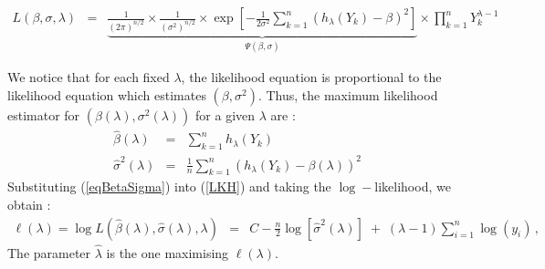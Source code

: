 \begin{eqnarray}\label{LKH}
\label{eq:MLE}
L(\beta,\sigma,\lambda)
& = &
\underbrace
{ \frac{1}{(2\pi)^{n/2}}
 \times
 \frac{1}{(\sigma^2)^{n/2}}
 \times
 \exp\left[
 -\frac{1}{2\sigma^2}
 \sum_{k=1}^{n}
 \left(
 h_\lambda(Y_k)-\beta
 \right)^2
 \right]
}_{\Psi(\beta, \sigma)}
\times 
\prod_{k=1}^{n} Y_k^{\lambda - 1}
\end{eqnarray}

We notice that for each fixed $\lambda$, the likelihood equation is proportional to the likelihood equation which estimates  $(\beta, \sigma^2)$.
Thus, the maximum likelihood estimator for $(\beta(\lambda), \sigma^2(\lambda))$ for a given $\lambda$  are :
\begin{eqnarray}\label{eqBetaSigma}
 \hat{\beta}(\lambda) & = & \sum_{k=1}^{n} h_{\lambda}(Y_k) \\
 \hat{\sigma}^2(\lambda)  & = &  \frac{1}{n} \sum_{k=1}^{n} (h_{\lambda}(Y_k) - \beta(\lambda))^2
\end{eqnarray}
Substituting (\ref{eqBetaSigma}) into (\ref{LKH}) and taking the $\log-$likelihood, we obtain :
\begin{eqnarray}
  			\ell(\lambda) = \log L( \hat{\beta}(\lambda), \hat{\sigma}(\lambda),\lambda ) & = & C - 
				\frac{n}{2}
			 	\log\left[\hat{\sigma}^2(\lambda)\right]
		  		\;+\;
				\left(\lambda - 1 \right) \sum_{i=1}^n \log(y_i)\,,%
\end{eqnarray}
The parameter $\hat{\lambda}$ is the one maximising $\ell(\lambda)$.\\


